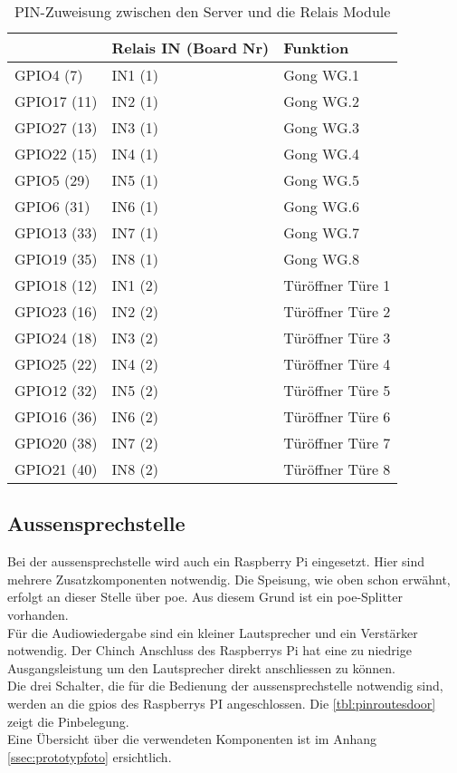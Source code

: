 \begin{table}[]
	\centering
	\label{my-label}
	\begin{tabular}{l|ll}
		\multicolumn{1}{r|}{} \textbf{Pi GPIO (PIN)} & \textbf{Relais IN (Board Nr)} & \textbf{Funktion}  \hspace{60pt}	\\ \hline
		GPIO4 (7)	&	IN1 (1)			& Gong WG.1			\\ \hline
		GPIO17 (11)	&	IN2 (1)			& Gong WG.2			\\ \hline
		GPIO27 (13)	&	IN3 (1)			& Gong WG.3			\\ \hline
		GPIO22 (15)	&	IN4 (1)			& Gong WG.4			\\ \hline
		GPIO5 (29)	&	IN5 (1)			& Gong WG.5			\\ \hline
		GPIO6 (31)	&	IN6 (1)			& Gong WG.6			\\ \hline
		GPIO13 (33)	&	IN7 (1)			& Gong WG.7			\\ \hline
		GPIO19 (35)	&	IN8 (1)			& Gong WG.8			\\ \hline
		GPIO18 (12)	&	IN1 (2)			& Türöffner Türe 1			\\ \hline
		GPIO23 (16)	&	IN2 (2)			& Türöffner Türe 2			\\ \hline
		GPIO24 (18)	&	IN3 (2)			& Türöffner Türe 3			\\ \hline
		GPIO25 (22)	&	IN4 (2)			& Türöffner Türe 4			\\ \hline
		GPIO12 (32)	&	IN5 (2)			& Türöffner Türe 5			\\ \hline
		GPIO16 (36)	&	IN6 (2)			& Türöffner Türe 6			\\ \hline
		GPIO20 (38)	&	IN7 (2)			& Türöffner Türe 7			\\ \hline
		GPIO21 (40)	&	IN8 (2)			& Türöffner Türe 8			\\ \hline
	\end{tabular}
	\caption{PIN-Zuweisung zwischen den Server und die Relais Module}
	\label{tbl:pinroutes}
\end{table}


\subsection{Aussensprechstelle}
\label{sec:chapterexample}
Bei der \gls{aussensprechstelle} wird auch ein Raspberry Pi eingesetzt. Hier sind mehrere Zusatzkomponenten notwendig. Die Speisung, wie oben schon erwähnt, erfolgt an dieser Stelle über \gls{poe}. Aus diesem Grund ist ein \gls{poe}-Splitter vorhanden.
\\
\newpage
Für die Audiowiedergabe sind ein kleiner Lautsprecher und ein Verstärker notwendig. Der Chinch Anschluss des Raspberrys Pi hat eine zu niedrige Ausgangsleistung um den Lautsprecher direkt anschliessen zu können.
\\
Die drei Schalter, die für die Bedienung der \gls{aussensprechstelle} notwendig sind, werden an die \gls{gpio}s des Raspberrys PI angeschlossen. Die \cref{tbl:pinroutesdoor} zeigt die Pinbelegung.
\\
Eine Übersicht über die verwendeten Komponenten ist im Anhang  \ref{ssec:prototypfoto} ersichtlich. 

